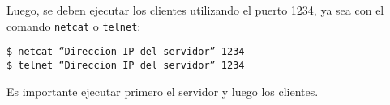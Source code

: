 Luego, se deben ejecutar los clientes utilizando el puerto 1234, ya sea con el comando \texttt{netcat} o \texttt{telnet}:

\begin{center}
    \texttt{\$ netcat \enquote{Direccion IP del servidor} 1234}\\
    \texttt{\$ telnet \enquote{Direccion IP del servidor} 1234}\\
\end{center}

Es importante ejecutar primero el servidor y luego los clientes.\\